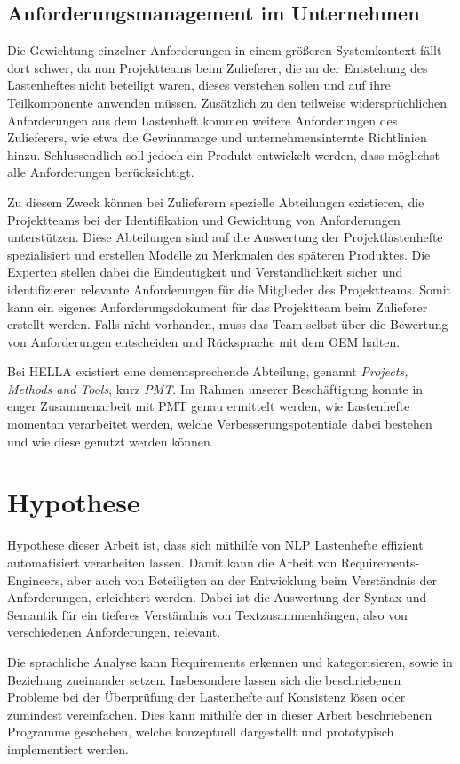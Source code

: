 \documentclass[12pt]{report}
\begin{document}
\subsection{Anforderungsmanagement im Unternehmen}
Die Gewichtung einzelner Anforderungen in einem größeren Systemkontext fällt dort schwer, da nun Projektteams beim Zulieferer, die an der Entstehung des Lastenheftes nicht beteiligt waren, dieses verstehen sollen und auf ihre Teilkomponente anwenden müssen. Zusätzlich zu den teilweise widersprüchlichen Anforderungen aus dem Lastenheft kommen weitere Anforderungen des Zulieferers, wie etwa die Gewinnmarge und unternehmensinternte Richtlinien hinzu. Schlussendlich soll jedoch ein Produkt entwickelt werden, dass möglichst alle Anforderungen berücksichtigt. \cite{mw02}

Zu diesem Zweck können bei Zulieferern spezielle Abteilungen existieren, die Projektteams bei der Identifikation und Gewichtung von Anforderungen unterstützen. Diese Abteilungen sind auf die Auswertung der Projektlastenhefte spezialisiert und erstellen Modelle zu Merkmalen des späteren Produktes. Die Experten stellen dabei die Eindeutigkeit und Verständlichkeit sicher und identifizieren relevante Anforderungen für die Mitglieder des Projektteams. Somit kann ein eigenes Anforderungsdokument für das Projektteam beim Zulieferer erstellt werden. 
Falls nicht vorhanden, muss das Team selbst über die Bewertung von Anforderungen entscheiden und Rücksprache mit dem OEM halten.

Bei HELLA existiert eine dementsprechende Abteilung, genannt \textit{Projects, Methods and Tools}, kurz \textit{PMT}. Im Rahmen unserer Beschäftigung konnte in enger Zusammenarbeit mit PMT genau ermittelt werden, wie Lastenhefte momentan verarbeitet werden, welche Verbesserungspotentiale dabei bestehen und wie diese genutzt werden können.

\section{Hypothese}
Hypothese dieser Arbeit ist, dass sich mithilfe von NLP Lastenhefte effizient automatisiert verarbeiten lassen. Damit kann die Arbeit von Requirements-Engineers, aber auch von Beteiligten an der Entwicklung beim Verständnis der Anforderungen, erleichtert werden. Dabei ist die Auswertung der Syntax und Semantik für ein tieferes Verständnis von Textzusammenhängen, also von verschiedenen Anforderungen, relevant.

Die sprachliche Analyse kann Requirements erkennen und kategorisieren, sowie in Beziehung zueinander setzen. Insbesondere lassen sich die beschriebenen Probleme bei der Überprüfung der Lastenhefte auf Konsistenz lösen oder zumindest vereinfachen. Dies kann mithilfe der in dieser Arbeit beschriebenen Programme geschehen, welche konzeptuell dargestellt und prototypisch implementiert werden. 
\end{document}

